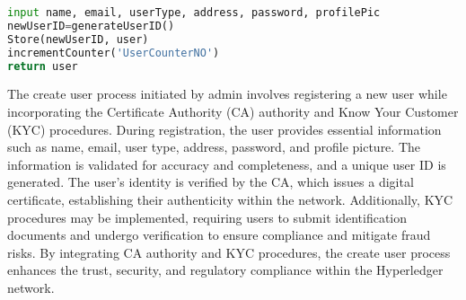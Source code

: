 \begin{lstlisting}[language=Python , caption=User register]
input name, email, userType, address, password, profilePic
newUserID=generateUserID()
Store(newUserID, user)
incrementCounter('UserCounterNO')
return user
\end{lstlisting}
The create user process initiated by admin involves registering a new user while incorporating the Certificate Authority (CA) authority and Know Your Customer (KYC) procedures. During registration, the user provides essential information such as name, email, user type, address, password, and profile picture. The information is validated for accuracy and completeness, and a unique user ID is generated. The user's identity is verified by the CA, which issues a digital certificate, establishing their authenticity within the network. Additionally, KYC procedures may be implemented, requiring users to submit identification documents and undergo verification to ensure compliance and mitigate fraud risks. By integrating CA authority and KYC procedures, the create user process enhances the trust, security, and regulatory compliance within the Hyperledger network.